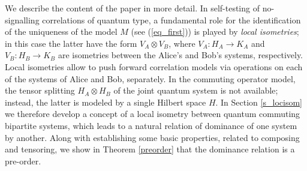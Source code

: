 \documentclass[11pt]{amsart}
\theoremstyle{definition}
\begin{document}
We describe the content of the paper in more detail. 
In self-testing of no-signalling correlations of quantum type, 
a fundamental role for the identification 
of the uniqueness of the model $M$ (see (\ref{eq_first})) 
is played by \emph{local isometries}; 
in this case the latter have the form $V_A\otimes V_B$, where $V_A : H_A\to K_A$ and 
$V_B : H_B\to K_B$ are isometries between the Alice's and Bob's systems, 
respectively. 
Local isometries allow to push forward correlation models
via operations on each of the systems of Alice and Bob, separately. 
In the commuting operator model, the tensor splitting 
$H_A\otimes H_B$ of the joint quantum system is not available; instead, 
the latter is modeled by a single Hilbert space $H$. 
In Section \ref{s_locisom} we therefore develop a concept of 
a local isometry between quantum commuting bipartite systems, which leads to a natural relation of dominance of one system by another.
Along with establishing some basic properties, related to composing and 
tensoring, we show in Theorem \ref{preorder} that the dominance relation is a 
pre-order.
\end{document}
